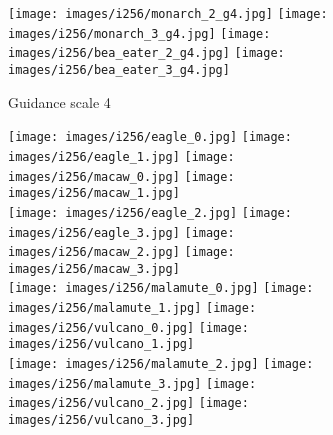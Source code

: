 \documentclass[nohyperref]{article}
\theoremstyle{plain}
\theoremstyle{definition}
\theoremstyle{remark}
\begin{document}
\begin{figure}
\begin{subfigure}[b]{0.495\textwidth}
\texttt{[image: images/i256/monarch\_2\_g4.jpg]} \hspace{.04cm } \texttt{[image: images/i256/monarch\_3\_g4.jpg]} \hspace{.04cm}
    \texttt{[image: images/i256/bea\_eater\_2\_g4.jpg]} \hspace{.04cm } \texttt{[image: images/i256/bea\_eater\_3\_g4.jpg]} \\ \vspace{.17cm}
\caption{Guidance scale 4}
 \end{subfigure} \hfill
\begin{subfigure}[b]{0.495\textwidth}
\centering
\texttt{[image: images/i256/eagle\_0.jpg]} \hspace{.04cm} \texttt{[image: images/i256/eagle\_1.jpg]} \hspace{.04cm}
    \texttt{[image: images/i256/macaw\_0.jpg]} \hspace{.04cm} \texttt{[image: images/i256/macaw\_1.jpg]} \\ \vspace{.17cm}
\texttt{[image: images/i256/eagle\_2.jpg]} \hspace{.04cm } \texttt{[image: images/i256/eagle\_3.jpg]} \hspace{.04cm}
    \texttt{[image: images/i256/macaw\_2.jpg]} \hspace{.04cm } \texttt{[image: images/i256/macaw\_3.jpg]} \\ \vspace{.17cm}
\texttt{[image: images/i256/malamute\_0.jpg]} \hspace{.04cm} \texttt{[image: images/i256/malamute\_1.jpg]} \hspace{.04cm}
    \texttt{[image: images/i256/vulcano\_0.jpg]} \hspace{.04cm} \texttt{[image: images/i256/vulcano\_1.jpg]} \\ \vspace{.17cm}
\texttt{[image: images/i256/malamute\_2.jpg]} \hspace{.04cm } \texttt{[image: images/i256/malamute\_3.jpg]} \hspace{.04cm}
    \texttt{[image: images/i256/vulcano\_2.jpg]} \hspace{.04cm } \texttt{[image: images/i256/vulcano\_3.jpg]} \\ \vspace{.17cm}

\end{subfigure}
\end{figure}
\end{document}
